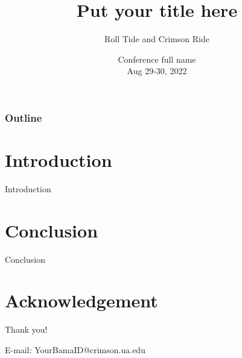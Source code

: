 \documentclass[10pt]{beamer}
\title[UA]{Put your title here}%
\author[Roll Tide]{Roll Tide\inst{1} and Crimson Ride\inst{1}}%
\institute[UA]{The University of Alabama\inst{1}}
\date[\textcolor{white}{Conference Name, 2022}]
{Conference full name\\
Aug 29-30, 2022}
\begin{document}
\frame{\titlepage}
\begin{frame}
\frametitle{Outline}
\tableofcontents
\end{frame}



\section{Introduction}
\begin{frame}{Introduction}

\end{frame}


\section{Conclusion}
\begin{frame}{Conclusion}
\end{frame}

\section*{Acknowledgement}  
\begin{frame}

\textcolor{myNewColorA}{\huge{\centerline{Thank you!}}}
\vspace*{0.5cm}

\textcolor{myNewColorA}{\Large{\centerline{E-mail: YourBamaID@crimson.ua.edu}}}

\end{frame}
\end{document}
